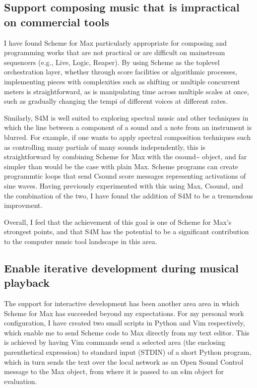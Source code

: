 \documentclass[letterpaper,10pt,english]{sphinxmanual}
\begin{document}
\subsection{Support composing music that is impractical on commercial tools}
\label{\detokenize{conclusion:support-composing-music-that-is-impractical-on-commercial-tools}}
\sphinxAtStartPar
I have found Scheme for Max particularly appropriate for composing and programming works that are
not practical or are difficult on mainstream sequencers (e.g., Live, Logic, Reaper).
By using Scheme as the top\sphinxhyphen{}level orchestration layer, whether through score facilities
or algorithmic processes, implementing pieces with complexities such as shifting or multiple concurrent
meters is straightforward, as is manipulating time across multiple scales at once, such as gradually
changing the tempi of different voices at different rates.

\sphinxAtStartPar
Similarly, S4M is well suited to exploring spectral music and other techniques in which the line between a
component of a sound and a note from an instrument is blurred. For example, if one wants to apply spectral composition
techniques such as controlling many partials of many sounds independently, this is straightforward by combining
Scheme for Max with the csound\textasciitilde{} object, and far simpler than would be the case with plain Max.
Scheme programs can create programmtic loops that send Csound score messages representing activations
of sine waves. Having previously experimented with this using Max, Csound, and the combination of the two, I have
found the addition of S4M to be a tremendous improvment.

\sphinxAtStartPar
Overall, I feel that the achievement of this goal is one of Scheme for Max’s strongest points,
and that S4M has the potential to be a significant contribution to the computer music tool landscape
in this area.


\subsection{Enable iterative development during musical playback}
\label{\detokenize{conclusion:enable-iterative-development-during-musical-playback}}
\sphinxAtStartPar
The support for interactive development has been another area area in which Scheme for Max has succeeded beyond
my expectations.
For my personal work configuration, I have created two small scripts in Python and Vim respectively,
which enable me to send Scheme code to Max directly from my text editor.
This is achieved by having Vim commands send a selected area (the enclosing parenthetical expression)
to standard input (STDIN) of a short Python program, which in turn sends the text over the local
network as an Open Sound Control message to the Max  object, from where it is passed
to an s4m object for evaluation.
\end{document}

